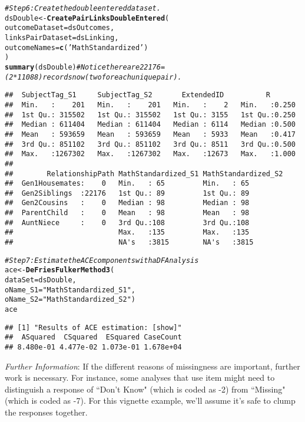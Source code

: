 \documentclass{article}\usepackage[]{graphicx}\usepackage[]{color}
\makeatletter
\newcommand{\hlstr}[1]{\textcolor[rgb]{0.192,0.494,0.8}{#1}}%
\newcommand{\hlcom}[1]{\textcolor[rgb]{0.678,0.584,0.686}{\textit{#1}}}%
\newcommand{\hlstd}[1]{\textcolor[rgb]{0.345,0.345,0.345}{#1}}%
\newcommand{\hlkwb}[1]{\textcolor[rgb]{0.69,0.353,0.396}{#1}}%
\newcommand{\hlkwc}[1]{\textcolor[rgb]{0.333,0.667,0.333}{#1}}%
\newcommand{\hlkwd}[1]{\textcolor[rgb]{0.737,0.353,0.396}{\textbf{#1}}}%
\newenvironment{kframe}{%
 \def\at@end@of@kframe{}%
 \ifinner\ifhmode%
  \def\at@end@of@kframe{\end{minipage}}%
  \begin{minipage}{\columnwidth}%
 \fi\fi%
 \def\FrameCommand##1{\hskip\@totalleftmargin \hskip-\fboxsep
 \colorbox{shadecolor}{##1}\hskip-\fboxsep
     \hskip-\linewidth \hskip-\@totalleftmargin \hskip\columnwidth}%
 \MakeFramed {\advance\hsize-\width
   \@totalleftmargin\z@ \linewidth\hsize
   \@setminipage}}%
 {\par\unskip\endMakeFramed%
 \at@end@of@kframe}
\newenvironment{knitrout}{}{} %
\makeatother
\begin{document}
\begin{knitrout}
\begin{kframe}
\begin{alltt}
\hlcom{#Step 6: Create the double entered dataset.}
\hlstd{dsDouble} \hlkwb{<-} \hlkwd{CreatePairLinksDoubleEntered}\hlstd{(}
  \hlkwc{outcomeDataset}\hlstd{=dsOutcomes,}
  \hlkwc{linksPairDataset}\hlstd{=dsLinking,}
  \hlkwc{outcomeNames}\hlstd{=}\hlkwd{c}\hlstd{(}\hlstr{'MathStandardized'}\hlstd{)}
\hlstd{)}
\hlkwd{summary}\hlstd{(dsDouble)} \hlcom{#Notice there are 22176=(2*11088) records now (two for each unique pair).}
\end{alltt}
\begin{verbatim}
##  SubjectTag_S1     SubjectTag_S2       ExtendedID          R        
##  Min.   :    201   Min.   :    201   Min.   :    2   Min.   :0.250  
##  1st Qu.: 315502   1st Qu.: 315502   1st Qu.: 3155   1st Qu.:0.250  
##  Median : 611404   Median : 611404   Median : 6114   Median :0.500  
##  Mean   : 593659   Mean   : 593659   Mean   : 5933   Mean   :0.417  
##  3rd Qu.: 851102   3rd Qu.: 851102   3rd Qu.: 8511   3rd Qu.:0.500  
##  Max.   :1267302   Max.   :1267302   Max.   :12673   Max.   :1.000  
##                                                                     
##        RelationshipPath MathStandardized_S1 MathStandardized_S2
##  Gen1Housemates:    0   Min.   : 65         Min.   : 65        
##  Gen2Siblings  :22176   1st Qu.: 89         1st Qu.: 89        
##  Gen2Cousins   :    0   Median : 98         Median : 98        
##  ParentChild   :    0   Mean   : 98         Mean   : 98        
##  AuntNiece     :    0   3rd Qu.:108         3rd Qu.:108        
##                         Max.   :135         Max.   :135        
##                         NA's   :3815        NA's   :3815
\end{verbatim}
\begin{alltt}
\hlcom{#Step 7: Estimate the ACE components with a DF Analysis }
\hlstd{ace} \hlkwb{<-} \hlkwd{DeFriesFulkerMethod3}\hlstd{(}
    \hlkwc{dataSet}\hlstd{=dsDouble,}
    \hlkwc{oName_S1}\hlstd{=}\hlstr{"MathStandardized_S1"}\hlstd{,}
    \hlkwc{oName_S2}\hlstd{=}\hlstr{"MathStandardized_S2"}\hlstd{)}
\hlstd{ace}
\end{alltt}
\begin{verbatim}
## [1] "Results of ACE estimation: [show]"
##  ASquared  CSquared  ESquared CaseCount 
## 8.480e-01 4.477e-02 1.073e-01 1.678e+04
\end{verbatim}
\end{kframe}
\end{knitrout}


\emph{Further Information}: If the different reasons of missingness are important, further work is necessary.  For instance, some analyses that use item  might need to distinguish a response of ``Don't Know" (which is coded as -2) from ``Missing" (which is coded as -7).  For this vignette example, we'll assume it's safe to clump the responses together.
\end{document}
